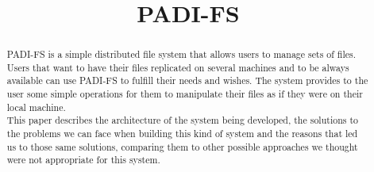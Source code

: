 \documentclass[times, 10pt,twocolumn]{article}
\begin{document}
\title{PADI-FS}


\maketitle
\thispagestyle{empty}

\begin{abstract}
   PADI-FS is a simple distributed file system that allows users to manage
   sets of files. Users that want to have their files replicated on several
   machines and to be always available can use PADI-FS to fulfill their
   needs and wishes. The system provides to the user some simple operations
   for them to manipulate their files as if they were on their local machine.\\

   This paper describes the architecture of the system being developed, the
   solutions to the problems we can face when building this kind of system
   and the reasons that led us to those same solutions, comparing them to
   other possible approaches we thought were not appropriate for this system.
\end{abstract}








\end{document}
